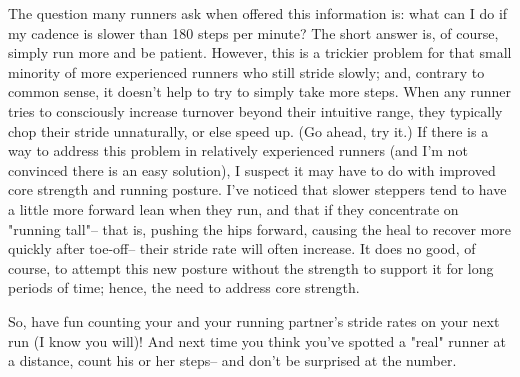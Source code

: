 The question many runners ask when offered this information is: what can I do if my cadence is slower than 180 steps per minute? The short answer is, of course, simply run more and be patient. However, this is a trickier problem for that small minority of more experienced runners who still stride slowly; and, contrary to common sense, it doesn't help to try to simply take more steps. When any runner tries to consciously increase turnover beyond their intuitive range, they typically chop their stride unnaturally, or else speed up. (Go ahead, try it.) If there is a way to address this problem in relatively experienced runners (and I'm not convinced there is an easy solution), I suspect it may have to do with improved core strength and running posture. I've noticed that slower steppers tend to have a little more forward lean when they run, and that if they concentrate on "running tall"-- that is, pushing the hips forward, causing the heal to recover more quickly after toe-off-- their stride rate will often increase. It does no good, of course, to attempt this new posture without the strength to support it for long periods of time; hence, the need to address core strength.

So, have fun counting your and your running partner's stride rates on your next run (I know you will)! And next time you think you've spotted a "real" runner at a distance, count his or her steps-- and don't be surprised at the number.




